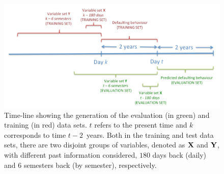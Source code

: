 
\begin{figure}[ht!]
\centering
\includegraphics[scale=0.45]{figures/CajaMarTimeLine}
\caption{\label{Figure:CajaMarTimeLine}Time-line showing the generation of the evaluation (in green) and training (in red) data sets. $t$ refers to the present time and $k$ corresponds to time $t-2$\ years. Both in the training and test data sets, there are two disjoint groups of variables, denoted as $\mathbf{X}$ and $\mathbf{Y}$, with different past information considered, $180$ days back (daily) and $6$ semesters back (by semester), respectively.}

\end{figure}

